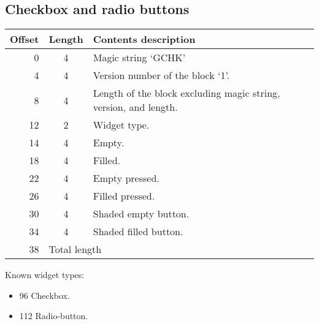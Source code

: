 \documentclass{article}
\begin{document}
\subsection{Checkbox and radio buttons}
\begin{center}
\begin{tabular}{|r|c|l|} \hline
\textbf{Offset} & \textbf{Length} & \textbf{Contents description} \\ \hline
   0 &  4 & Magic string `GCHK' \\
   4 &  4 & Version number of the block `1'. \\
   8 &  4 & Length of the block excluding magic string, version, and length. \\
  12 &  2 & Widget type. \\
  14 &  4 & Empty. \\
  18 &  4 & Filled. \\
  22 &  4 & Empty pressed. \\
  26 &  4 & Filled pressed. \\
  30 &  4 & Shaded empty button. \\
  34 &  4 & Shaded filled button. \\
  38 & \multicolumn{2}{l|}{Total length} \\ \hline
\end{tabular}
\end{center}

Known widget types:
\begin{itemize}
\item 96 Checkbox.
\item 112 Radio-button.
\end{itemize}
\end{document}
